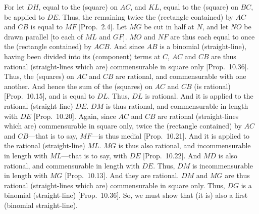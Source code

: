 \begin{Parallel}{}{}
{For let $DH$, equal to the (square) on $AC$,  and $KL$, equal to the
(square) on $BC$, be applied to $DE$. Thus, the remaining twice
the (rectangle contained) by $AC$ and $CB$ is equal to $MF$ [Prop.~2.4].  Let $MG$ be cut in half
at $N$, and let $NO$ be drawn parallel [to each of $ML$ and
$GF$]. $MO$ and $NF$ are thus each equal to once the (rectangle contained)
by $ACB$. And since $AB$ is a binomial (straight-line), having been divided into its (component) terms at $C$,  $AC$ and $CB$ are thus rational (straight-lines which are) commensurable in square only [Prop.~10.36]. Thus, the (squares) on $AC$ and $CB$ are rational, and commensurable with one another.  And hence the
sum of the (squares) on $AC$ and $CB$ (is rational) [Prop.~10.15], and is equal to $DL$. Thus, $DL$
is rational. And it is applied to the rational (straight-line) $DE$. $DM$
is thus rational, and commensurable in length with $DE$ [Prop.~10.20]. Again, since $AC$ and $CB$
are rational (straight-lines which are) commensurable in square only, twice the (rectangle contained) by $AC$ and $CB$---that is to say, $MF$---is thus medial [Prop.~10.21]. And it is applied to the
rational (straight-line) $ML$. $MG$ is thus also rational, and incommensurable in length with $ML$---that is to say, with $DE$
[Prop.~10.22].  And $MD$ is also rational, and
commensurable in length with $DE$. Thus, $DM$ is  incommensurable in length with $MG$ [Prop.~10.13]. And
they are rational. $DM$ and $MG$ are thus rational (straight-lines which
are) commensurable in square only. Thus, $DG$ is a binomial (straight-line)
[Prop.~10.36]. So, we must show that (it is)
also a first (binomial straight-line).

}
\end{Parallel}
